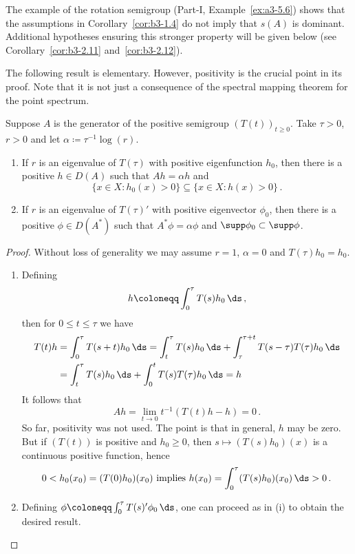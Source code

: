 The example of the rotation semigroup (Part-I, Example~\ref{ex:a3-5.6}) shows that the assumptions in Corollary~\ref{cor:b3-1.4} do not imply that $s(A)$ is dominant.
Additional hypotheses ensuring this stronger property will be given below (see Corollary~\ref{cor:b3-2.11} and~\ref{cor:b3-2.12}).

The following result is elementary. 
However, positivity is the crucial point in its proof. 	
Note that it is not just a consequence of the spectral mapping theorem for the point spectrum.
\begin{proposition}\label{prop:b3-1.5}
Suppose $A$ is the generator of the positive semigroup $(T(t))_{t \geq 0}$.
Take $\tau > 0$, $r > 0$ and let $\alpha \coloneqq \tau^{-1}\log(r)$.
\begin{enumerate}[\upshape (i)]
\item 
If\/ $r$ is an eigenvalue of\/ $T(\tau)$ with positive eigenfunction
$h_{0}$, then there is a positive $h \in D(A)$ such that $Ah = \alpha h$ and 
\[
\{x \in X \colon h_{0}(x) > 0\} \subseteq \{x \in X \colon h(x) > 0\}\,.
\]
		
\item 
If\/ $r$ is an eigenvalue of\/ $T(\tau)'$ with positive eigenvector $\phi_{0}$, then there is a positive $\phi \in D(A^*)$ such that $A^*\phi = \alpha\phi$ and $\supp\phi_{0} \subset \supp\phi$.
	\end{enumerate}
\end{proposition}
\begin{proof}
	Without loss of generality we may assume $r = 1$, \ie $\alpha = 0$ and $T(\tau)h_{0} = h_{0}$.
	\begin{enumerate}[\upshape (i), wide, labelindent=.25em]
    \item 
	Defining
	\begin{equation}\label{eq:b3-1.14}
		h \coloneqq \int_{0}^{\tau} T(s)h_{0} \, \ds \,,
	\end{equation}
	then for $0 \leq t \leq \tau$ we have
	\begin{align*}
		T(t)h &= \int_{0}^{\tau} T(s+t)h_{0} \, \ds  = \int_{t}^{\tau} T(s)h_{0} \, \ds  + \int_{\tau}^{\tau+t} T(s-\tau)T(\tau)h_{0} \, \ds  \\
		&= \int_{t}^{\tau} T(s)h_{0} \, \ds  + \int_{0}^{t} T(s)T(\tau)h_{0} \, \ds  = h
	\end{align*}
	It follows that 
    \[
    Ah = \lim_{t \to 0} t^{-1}(T(t)h - h) = 0\,.
    \]
	So far, positivity was not used. 
    The point is that in general, $h$ may be zero.
	But if\/ $(T(t))$ is positive and $h_{0} \geq 0$, then $s \mapsto (T(s)h_{0})(x)$ is a continuous positive function, hence 
    \[
    0 < h_{0}(x_{0}) = (T(0)h_{0})(x_{0}) \text{ implies } h(x_{0}) = \int_{0}^{\tau} (T(s)h_{0})(x_{0}) \, \ds  > 0\,.
    \]
	\item 
	Defining $\phi \coloneqq \int_{0}^{\tau} T(s)'\phi_{0} \, \ds $, one can proceed as in (i) to obtain the desired result.
	\qedhere
	\end{enumerate}
\end{proof}
